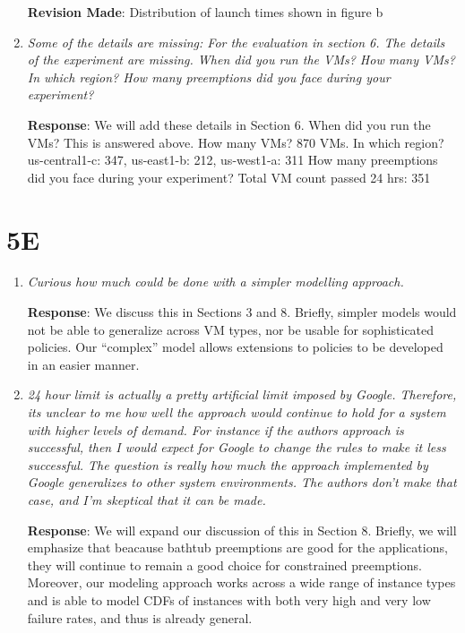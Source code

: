 \documentclass{article}
\newcommand{\resp}[1]{\textbf{Response}: #1}
\newcommand{\revmade}[1]{\textbf{Revision Made}: #1}
\begin{document}
\begin{enumerate}
\revmade{Distribution of launch times shown in figure b}

\item \emph{Some of the details are missing: For the evaluation in section 6. The details of the experiment are missing. When did you run the VMs? How many VMs? In which region? How many preemptions did you face during your experiment?}

\resp{We will add these details in Section 6.
When did you run the VMs? This is answered above.
How many VMs? 870 VMs.
In which region? us-central1-c: 347, us-east1-b: 212, us-west1-a: 311
How many preemptions did you face during your experiment? Total VM count passed 24 hrs: 351
}

\end{enumerate}

\section{5E}

\begin{enumerate}

\item \emph{Curious how much could be done with a simpler modelling approach.}

\resp{We discuss this in Sections 3 and 8. Briefly, simpler models would not be able to generalize across VM types, nor be usable for sophisticated policies. Our ``complex'' model allows extensions to policies to be developed in an easier manner.}

\item \emph{24 hour limit is actually a pretty artificial limit imposed by Google. Therefore, its unclear to me how well the approach would continue to hold for a system with higher levels of demand. For instance if the authors approach is successful, then I would expect for Google to change the rules to make it less successful. The question is really how much the approach implemented by Google generalizes to other system environments. The authors don't make that case, and I'm skeptical that it can be made.}

\resp{We will expand our discussion of this in Section 8. Briefly, we will emphasize that  beacause bathtub preemptions are good for the applications, they will continue to remain a good choice for constrained preemptions. Moreover, our modeling approach works across a wide range of instance types and is able to model CDFs of instances with both very high and very low failure rates, and thus is already general. }



\end{enumerate}
\end{document}
